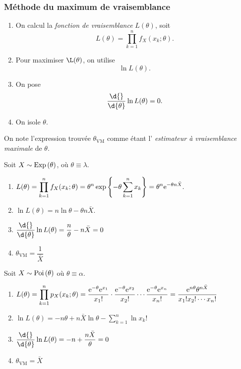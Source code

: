 \documentclass[11pt]{article}
\newcommand\e{%
	\ensuremath{%
		\mathrm{e}%
	}%
}%
\newcommand\Poi[1]{%
	\ensuremath{%
		\mathrm{Poi}\left(#1\right)%
	}%
}%
\newcommand\Exp[1]{%
	\ensuremath{%
		\mathrm{Exp}\left(#1\right)%
	}%
}%
\theoremstyle{remark}
\theoremstyle{definition}
\begin{document}
\subsubsection{Méthode du maximum de vraisemblance}
\begin{enumerate}
	\item On calcul la \textit{fonction de vraisemblance} $L(\theta)$, soit
	\begin{equation*}
		L(\theta)=\prod_{k=1}^nf_X(x_k;\theta).
	\end{equation*}

	\item Pour maximiser $\L(\theta)$, on utilise
	\begin{equation*}
		\ln{L(\theta)}.
	\end{equation*}

	\item On pose
	\begin{equation*}
		\frac{\d{}}{\d{\theta}}\ln{L(\theta)}=0.
	\end{equation*}

	\item On isole $\theta$.
\end{enumerate}
On note l'expression trouvée $\theta_{\text{VM}}$ comme étant l'\textit{
estimateur à vraisemblance maximale} de $\theta$.

\begin{exemple}
	Soit $X\sim\Exp{\theta}$, où $\theta\equiv\lambda$.
	\begin{enumerate}
		\item $
			L(\theta)
			=\displaystyle\prod_{k=1}^nf_X(x_k;\theta)
			=\theta^n\exp\left\{-\theta\displaystyle\sum_{k=1}^nx_k\right\}
			=\theta^n\e^{-\theta n\bar{X}}.
		$

		\item $
			\ln{L(\theta)}
			=n\ln{\theta}-\theta n\bar{X}.
		$

		\item $
			\dfrac{\d{}}{\d{\theta}}\ln{L(\theta)}
			=\dfrac{n}{\theta}-n\bar{X}
			=0
		$

		\item $
			\theta_{\text{VM}}=\dfrac{1}{\bar{X}}
		$
	\end{enumerate}
\end{exemple}

\begin{exemple}
	Soit $X\sim\Poi{\theta}$ où $\theta\equiv\alpha$.

	\begin{enumerate}
		\item $
			L(\theta)
			=\displaystyle\prod_{k=1}^np_X(x_k;\theta)
			=\dfrac{\e^{-\theta}\e^{x_1}}{x_1!}\cdot
			 \dfrac{\e^{-\theta}\e^{x_2}}{x_2!}\cdots
			 \dfrac{\e^{-\theta}\e^{x_n}}{x_n!}
			=\dfrac{\e^{n\theta}\theta^{n\bar{X}}}{x_1!x_2!\cdots x_n!}
		$
		\item $
			\ln{L(\theta)}
			=-n\theta+n\bar{X}\ln{\theta}-\displaystyle\sum_{k=1}^n\ln{x_k!}
		$
		\item $
			\dfrac{\d{}}{\d{\theta}}\ln{L(\theta)}
			=-n+\dfrac{n\bar{X}}{\theta}
			=0
		$
		\item $
			\theta_{\text{VM}}=\bar{X}
		$
	\end{enumerate}
\end{exemple}
\end{document}
